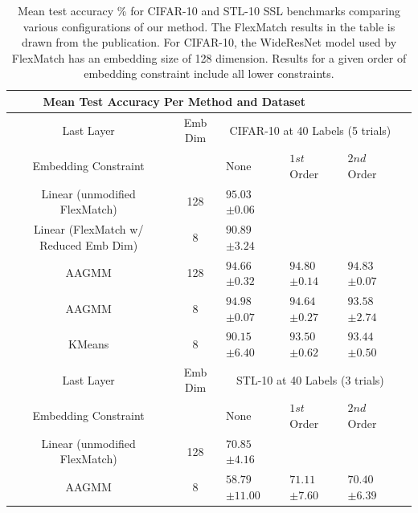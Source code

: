 \documentclass[10pt,twocolumn,letterpaper]{article}
\begin{document}
\begin{table}[ht!]
	\begin{tabularx}{\textwidth}{c|c|XXXX}
		\multicolumn{4}{c}{Mean Test Accuracy Per Method and Dataset} \\ \hline\hline
		Last Layer &   Emb Dim   & \multicolumn{3}{c}{CIFAR-10 at 40 Labels (5 trials)}            \\ 
		\hline
		Embedding Constraint  &  & None & $1st$ Order & $2nd$ Order\\ 
		\hline
		Linear (unmodified FlexMatch) & 128  & $95.03$ \scriptsize{$\pm 0.06$}   &  &  \\
		Linear (FlexMatch w/ Reduced Emb Dim) & 8  & $90.89$ \scriptsize{$\pm 3.24$}      &  & \\
		\hline
		AAGMM & 128  & $94.66$ \scriptsize{$\pm 0.32$}    & $94.80$ \scriptsize{$\pm 0.14$} & $94.83$ \scriptsize{$\pm 0.07$}  \\
		AAGMM & 8  & $94.98$ \scriptsize{$\pm 0.07$}    & $94.64$ \scriptsize{$\pm 0.27$} & $93.58$ \scriptsize{$\pm 2.74$}  \\
		\hline
		KMeans & 8  & $90.15$ \scriptsize{$\pm 6.40$}    & $93.50$ \scriptsize{$\pm 0.62$} & $93.44$ \scriptsize{$\pm 0.50$}   \\
		
		
		\hline\hline
		Last Layer  &   Emb Dim  & \multicolumn{3}{c}{STL-10 at 40 Labels (3 trials)}            \\ 
		\hline
		\multicolumn{1}{c|}{Embedding Constraint} &  & None & $1st$ Order & $2nd$ Order  \\ 
		\hline
		Linear (unmodified FlexMatch) & 128  & $70.85$ \scriptsize{$\pm 4.16$}   &  &   \\
		\hline
		AAGMM & 8  & $58.79$ \scriptsize{$\pm 11.00$}    & $71.11$ \scriptsize{$\pm 7.60$} & $70.40$ \scriptsize{$\pm 6.39$}  \\
	\end{tabularx}
	\caption{Mean test accuracy \% for CIFAR-10 and STL-10 SSL benchmarks comparing various configurations of our method. The FlexMatch results in the table is drawn from the publication. For CIFAR-10, the WideResNet model used by FlexMatch has an embedding size of 128 dimension. Results for a given order of embedding constraint include all lower constraints.}
	\label{table1}
\end{table}

\end{document}
